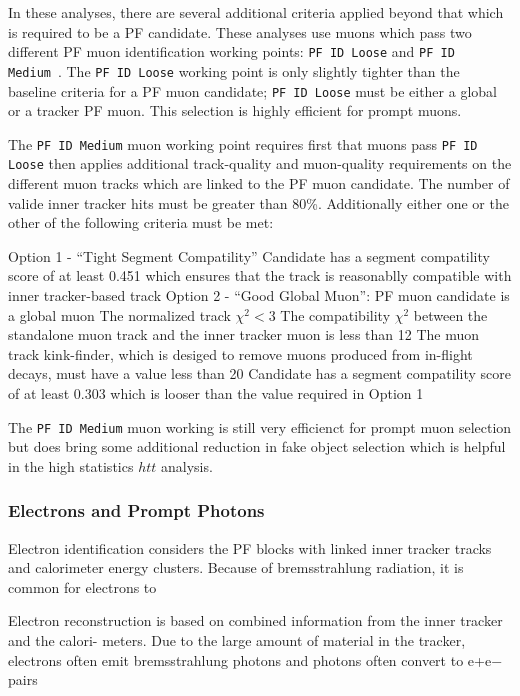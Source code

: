 In these analyses, there are several additional criteria applied beyond that which is required to
be a PF candidate. These analyses use muons which pass two different PF muon identification working
points: \texttt{PF ID Loose} and \texttt{PF ID Medium}~\cite{sm-htt-2017}. The \texttt{PF ID Loose}
working point is only slightly tighter than the baseline criteria for a PF muon candidate; 
\texttt{PF ID Loose} must be either a global or a tracker PF muon. This selection is highly efficient
for prompt muons.

The \texttt{PF ID Medium} muon working point requires first that muons pass \texttt{PF ID Loose} then
applies additional track-quality and muon-quality requirements on the different muon tracks which are
linked to the PF muon candidate. The number of valide inner tracker
hits must be greater than 80\%. Additionally either one or the other of the following criteria must be met:
\begin{outline}
\1 Option 1 - ``Tight Segment Compatility''
    \2 Candidate has a segment compatility score of at least 0.451 which ensures that the 
track is reasonablly compatible with inner tracker-based track
\1 Option 2 - ``Good Global Muon'':
    \2 PF muon candidate is a global muon
    \2 The normalized track $\chi^2 < 3$
    \2 The compatibility $\chi^2$ between the standalone muon track and the inner tracker muon is
less than 12
    \2 The muon track kink-finder, which is desiged to remove muons produced from in-flight decays, 
must have a value less than 20
    \2 Candidate has a segment compatility score of at least 0.303 which is looser than the value
required in Option 1
\end{outline}
The \texttt{PF ID Medium} muon working is still very efficienct for prompt muon selection but
does bring some additional reduction in fake object selection which is helpful in the high
statistics $htt$ analysis. 


\subsubsection{Electrons and Prompt Photons}
Electron identification considers the PF blocks with linked inner tracker tracks and calorimeter
energy clusters. Because of bremsstrahlung radiation, it is common for electrons to 

Electron reconstruction is based on combined information from the inner tracker and the calori- meters. Due to the large amount of material in the tracker, electrons often emit bremsstrahlung photons and photons often convert to e+e− pairs

